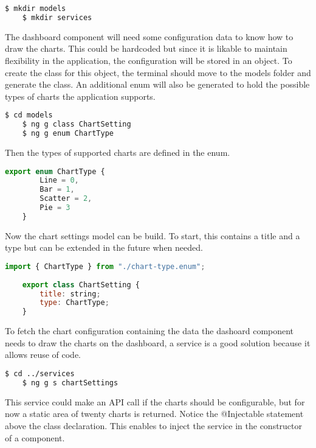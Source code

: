 \begin{lstlisting}[language=bash]
	$ mkdir models
	$ mkdir services
\end{lstlisting}

The dashboard component will need some configuration data to know how to draw the charts. This could be hardcoded but since it is likable to maintain flexibility in the application, the configuration will be stored in an object. To create the class for this object, the terminal should move to the models folder and generate the class. An additional enum will also be generated to hold the possible types of charts the application supports.

\begin{lstlisting}[language=bash]
	$ cd models
	$ ng g class ChartSetting
	$ ng g enum ChartType
\end{lstlisting}

Then the types of supported charts are defined in the enum.

\begin{lstlisting}[language=JavaScript]
	export enum ChartType {
		Line = 0,
		Bar = 1,
		Scatter = 2,
		Pie = 3
	}
\end{lstlisting}

Now the chart settings model can be build. To start, this contains a title and a type but can be extended in the future when needed.

\begin{lstlisting}[language=JavaScript]
	import { ChartType } from "./chart-type.enum";
	
	export class ChartSetting {
		title: string;
		type: ChartType;
	}
\end{lstlisting}

To fetch the chart configuration containing the data the dashoard component needs to draw the charts on the dashboard, a service is a good solution because it allows reuse of code.
 
\begin{lstlisting}[language=bash]
	$ cd ../services
	$ ng g s chartSettings
\end{lstlisting}

This service could make an API call if the charts should be configurable, but for now a static area of twenty charts is returned. Notice the @Injectable statement above the class declaration. This enables to inject the service in the constructor of a component.

